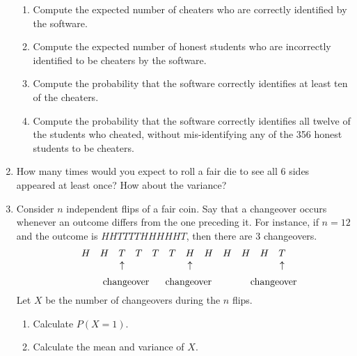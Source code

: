 \documentclass[12pt]{article}%
\newcommand{\0}{{\bf 0}}
\begin{document}
\begin{enumerate}
\begin{enumerate}
\item Compute the expected number of cheaters who are correctly identified by the software.
\\
{\color{blue}{\bf Sol.}}




\item Compute the expected number of honest students who are incorrectly identified to be cheaters by the software.
\\
{\color{blue}{\bf Sol.}}




\item Compute the probability that the software correctly identifies at least ten of the cheaters.
\\
{\color{blue}{\bf Sol.}}




\item Compute the probability that the software correctly identifies all twelve of the students who cheated, without mis-identifying any of the 356 honest students to be cheaters.
\\
{\color{blue}{\bf Sol.}}




\end{enumerate}




\item
How many times would you expect to roll a fair die to see all 6 sides appeared at least once?
How about the variance?






 

\item
Consider $n$ independent flips of a fair coin. 
Say that a changeover occurs whenever an outcome differs from the one preceding it. For instance, if $n=12$ and the outcome is $HHTTTTHHHHHT$, then there are 3 changeovers.
$$
\ba{cccccccccccc}
H&H&T&T&T&T&H&H&H&H&H&T\\
&&\uparrow&&&&\uparrow&&&&&\uparrow
\ea
$$
$$
\ \ \ \ \ \ \ \ \ \ \mb{changeover}\ \ \ \ \ \mb{changeover}\ \ \ \ \ \ \ \ \ \ \ \ \mb{changeover}
$$ 
Let $X$ be the number of changeovers during the $n$ flips.
\begin{enumerate}
\item
Calculate $P(X=1)$. 


\item
Calculate the mean and variance of $X$. 





\end{enumerate}
\end{enumerate}
\end{document}
